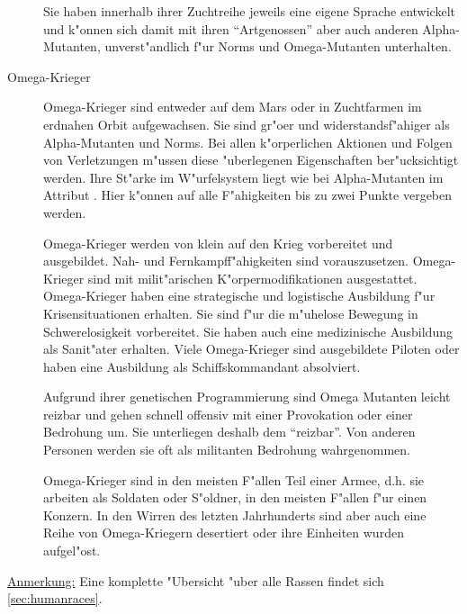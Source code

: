 \begin{description}
        Sie haben innerhalb ihrer Zuchtreihe jeweils eine eigene Sprache entwickelt und k"onnen sich damit mit ihren ``Artgenossen'' aber auch anderen Alpha-Mutanten, unverst"andlich f"ur Norms und Omega-Mutanten unterhalten. 
    \item[Omega-Krieger] Omega-Krieger sind entweder auf dem Mars oder in Zuchtfarmen im erdnahen Orbit aufgewachsen. Sie sind   
        gr"o\3er und widerstandsf"ahiger als Alpha-Mutanten und Norms. Bei allen k"orperlichen Aktionen und Folgen von Verletzungen m"ussen diese "uberlegenen Eigenschaften ber"ucksichtigt werden. Ihre St"arke im W"urfelsystem liegt wie bei Alpha-Mutanten im Attribut . Hier k"onnen auf alle F"ahigkeiten bis zu zwei Punkte vergeben werden. 
        
        Omega-Krieger werden von klein auf den Krieg vorbereitet und ausgebildet. Nah- und Fernkampff"ahigkeiten sind vorauszusetzen. 
        Omega-Krieger sind mit milit"arischen K"orpermodifikationen ausgestattet. Omega-Krieger haben eine strategische und logistische Ausbildung f"ur Krisensituationen erhalten. Sie sind f"ur die m"uhelose Bewegung in Schwerelosigkeit vorbereitet. Sie haben auch eine medizinische Ausbildung als Sanit"ater erhalten. Viele Omega-Krieger sind ausgebildete Piloten oder haben eine Ausbildung als Schiffskommandant absolviert. 
        
        Aufgrund ihrer genetischen Programmierung sind Omega Mutanten leicht reizbar und gehen schnell offensiv mit einer Provokation oder einer Bedrohung um. Sie unterliegen deshalb dem  ``reizbar''. Von anderen Personen werden sie oft als militanten Bedrohung wahrgenommen.

        Omega-Krieger sind in den meisten F"allen Teil einer Armee, d.h. sie arbeiten als Soldaten oder S"oldner, in den meisten F"allen f"ur einen Konzern. In den Wirren des letzten Jahrhunderts sind aber auch eine Reihe von Omega-Kriegern desertiert oder ihre Einheiten wurden aufgel"ost.
\end{description}

\underline{Anmerkung:} Eine komplette "Ubersicht "uber alle Rassen findet sich \cref{sec:humanraces}.
